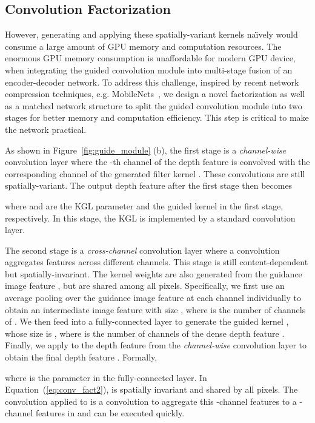 \documentclass[journal]{IEEEtran}
\begin{document}
\subsection{Convolution Factorization}
\label{subsec:conv_fact} 

However, generating and applying these spatially-variant kernels na\"{\i}vely would consume a large amount of GPU memory and computation resources.
The enormous GPU memory consumption is unaffordable for modern GPU device, 
when integrating the guided convolution module into multi-stage fusion of an encoder-decoder network.
To address this challenge, inspired by recent network compression techniques, e.g. MobileNets~\cite{MobileNets},
we design a novel factorization as well as a matched network structure to split the guided convolution module into two stages for better memory and computation efficiency.
This step is critical to make the network practical.

As shown in Figure~\ref{fig:guide_module} (b), the first stage is a \emph{channel-wise} convolution layer
where the -th channel of the depth feature  is convolved with the corresponding channel of the generated filter kernel .
These convolutions are still spatially-variant. The output depth feature  after the first stage then becomes

where  and  are the KGL parameter and the guided kernel in the first stage, respectively.
In this stage, the KGL is implemented by a standard convolution layer. 



The second stage is a \emph{cross-channel} convolution layer where a  convolution aggregates features across different channels.
This stage is still content-dependent but spatially-invariant.
The kernel weights are also generated from the guidance image feature , but are shared among all pixels.
Specifically, we first use an average pooling over the guidance image feature  at each channel individually
to obtain an intermediate image feature  with size , where  is the number of channels of  .
We then feed  into a fully-connected layer to generate the guided kernel , whose size is , where  is the number of channels of the dense depth feature .
Finally, we apply  to the depth feature  from the \emph{channel-wise} convolution layer to obtain the final depth feature  . Formally, 

where  is the parameter in the fully-connected layer.
In Equation~(\ref{eq:conv_fact2}),  is spatially invariant and shared by all pixels.
The convolution applied to  is a  convolution to aggregate this -channel features to a -channel features in  and can be executed quickly.
\end{document}
